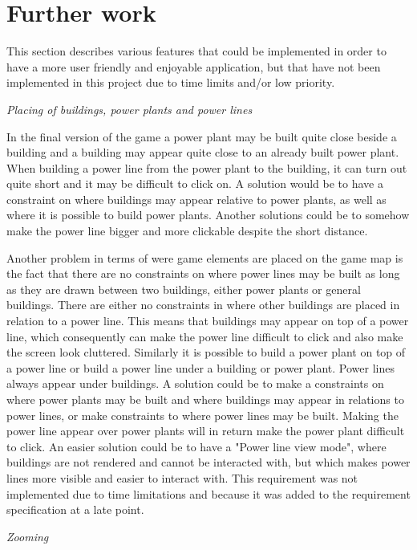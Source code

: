\section{Further work}

This section describes various features that could be implemented in order to have a 
more user friendly and enjoyable application, but that have not been implemented in 
this project due to time limits and/or low priority.

\textit{Placing of buildings, power plants and power lines}

In the final version of the game a power plant may be built quite close beside a building 
and a building may appear quite close to an already built power plant. When building a power 
line from the power plant to the building, it can turn out quite short and it may be difficult 
to click on. A solution would be to have a constraint on where buildings may appear relative 
to power plants, as well as where it is possible to build power plants. Another solutions 
could be to somehow make the power line bigger and more clickable despite the short distance. 

Another problem in terms of were game elements are placed on the game map is the fact that 
there are no constraints on where power lines may be built as long as they are drawn between 
two buildings, either power plants or general buildings. There are either no constraints in 
where other buildings are placed in relation to a power line. This means that buildings may 
appear on top of a power line, which consequently can make the power line difficult to click 
and also make the screen look cluttered. Similarly it is possible to build a power plant on 
top of a power line or build a power line under a building or power plant. Power lines always 
appear under buildings. A solution could be to make a constraints on where power plants 
may be built and where buildings may appear in relations to power lines, or make constraints 
to where power lines may be built. Making the power line appear over power plants will in return 
make the power plant difficult to click. An easier solution could be to have a 
"Power line view mode", where buildings are not rendered and cannot be interacted with, but which 
makes power lines more visible and easier to interact with. This requirement was not implemented 
due to time limitations and because it was added to the requirement specification at a late point.

\textit{Zooming}


